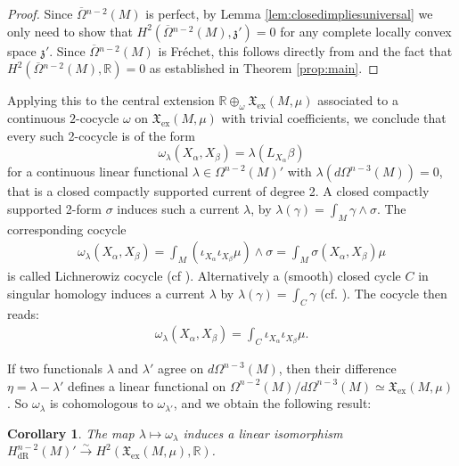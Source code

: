 \documentclass{article}
\newcommand{\ex}{\mathrm{ex}}
\newcommand{\dR}{\mathrm{dR}}
\newcommand{\fX}{\mathfrak{X}}
\newcommand{\R}{\mathbb{R}}
\newcommand{\oline}{\overline}
\newtheorem{Corollary}[Theorem]{Corollary}
\theoremstyle{definition}
\begin{document}
\begin{proof} Since $\oline{\Omega}{}^{n-2}(M)$ is perfect, by Lemma \ref{lem:closedimpliesuniversal} we only need to show that $H^2(\oline{\Omega}{}^{n-2}(M), \mathfrak z')=0$ for any complete locally convex space $\mathfrak z'$. Since $\oline{\Omega}{}^{n-2}(M)$ is Fréchet, this follows directly from \cite[Proposition 2.10]{Neeb2002} and the fact that  $H^2( \oline{\Omega}{}^{n-2}(M), \mathbb R)=0$ as established in Theorem \ref{prop:main}.
\end{proof}

Applying this to the central extension $\R \oplus_{\omega}\fX_{\ex}(M,\mu)$ associated to a continuous $2$-cocycle $\omega$ on 
$\fX_{\ex}(M,\mu)$ with trivial coefficients, we conclude that every such 2-cocycle
is of the form 
\begin{equation}
\omega_{\lambda}(X_{\alpha}, X_{\beta}) = \lambda({L_{X_{\alpha}}\beta})
\end{equation}
for a continuous linear functional $\lambda \in \Omega^{n-2}(M)'$ with $\lambda(d\Omega^{n-3}(M)) = 0$, that is a closed compactly supported current of degree 2. A closed compactly supported 2-form $\sigma$ induces such a current $\lambda$, by $\lambda(\gamma)=\int_M \gamma\wedge \sigma$. The corresponding cocycle 
\begin{align}\label{eq:LichnerowiczCocycle}
    \omega_\lambda(X_\alpha,X_\beta)= \int_M(\iota_{X_\alpha}\iota_{X_\beta}\mu)\wedge \sigma= \int_M\sigma(X_\alpha,X_\beta)\mu
\end{align}
is called Lichnerowiz cocycle (cf \cite{Lichnerowicz1974}).  Alternatively a (smooth) closed cycle $C$ in singular homology induces a current $\lambda$ by $\lambda(\gamma)=\int_C\gamma$ (cf. \cite[Section 2.1]{JanssensVizmanSurvey2016}). The cocycle then reads: 
\begin{align}\label{eq:OtherCocycle}
    \omega_\lambda(X_\alpha,X_\beta)= \int_C\iota_{X_\alpha}\iota_{X_\beta}\mu.
\end{align}


If two functionals $\lambda$ and $\lambda'$ agree on $d\Omega^{n-3}(M)$, 
then their difference $\eta = \lambda - \lambda'$ defines a linear functional on $\Omega^{n-2}(M)/d\Omega^{n-3}(M) \simeq \fX_{\ex}(M,\mu)$.
So $\omega_{\lambda}$ is cohomologous to $\omega_{\lambda'}$, and we obtain the following result:

\begin{Corollary}
The map $\lambda \mapsto \omega_{\lambda}$ induces a linear isomorphism 
$H^{n-2}_{\dR}(M)' \stackrel{\sim}{\rightarrow} H^2(\fX_{\ex}(M,\mu),\R)$.
\end{Corollary}
\end{document}
